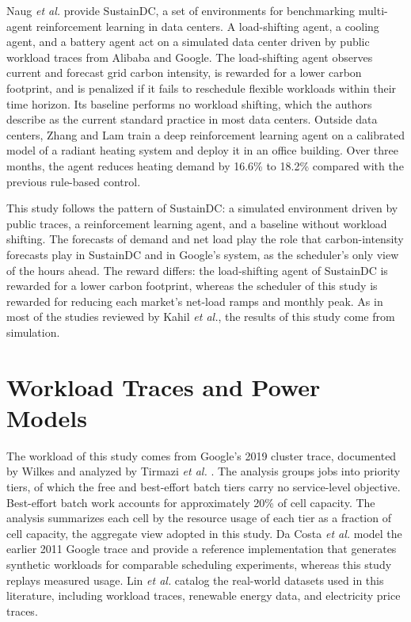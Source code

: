 \documentclass{UNCC-thesis}
\begin{document}
Naug \emph{et al.} \cite{naug2024sustaindc} provide SustainDC, a set of environments for
benchmarking multi-agent reinforcement learning in data centers. A load-shifting agent, a cooling
agent, and a battery agent act on a simulated data center driven by public workload traces from
Alibaba and Google. The load-shifting agent observes current and forecast grid carbon intensity,
is rewarded for a lower carbon footprint, and is penalized if it fails to reschedule flexible
workloads within their time horizon. Its baseline performs no workload shifting, which the authors
describe as the current standard practice in most data centers. Outside data centers, Zhang and
Lam \cite{zhang2018practical} train a deep reinforcement learning agent on a calibrated model of a
radiant heating system and deploy it in an office building. Over three months, the agent reduces
heating demand by 16.6\% to 18.2\% compared with the previous rule-based control.

This study follows the pattern of SustainDC: a simulated environment driven by public traces, a
reinforcement learning agent, and a baseline without workload shifting. The forecasts of demand
and net load play the role that carbon-intensity forecasts play in SustainDC and in Google's
system, as the scheduler's only view of the hours ahead. The reward differs: the load-shifting
agent of SustainDC is rewarded for a lower carbon footprint, whereas the scheduler of this study
is rewarded for reducing each market's net-load ramps and monthly peak. As in most of the studies reviewed by Kahil \emph{et al.}, the results
of this study come from simulation.

\section{Workload Traces and Power Models}
\label{sec:lit-data}

The workload of this study comes from Google's 2019 cluster trace, documented by Wilkes
\cite{wilkes2020clusterdata2019} and analyzed by Tirmazi \emph{et al.} \cite{tirmazi2020borg}.
The analysis groups jobs into priority tiers, of which the free and best-effort batch tiers carry
no service-level objective. Best-effort batch work accounts for approximately 20\% of cell
capacity.
The analysis summarizes each
cell by the resource usage of each tier as a fraction of cell capacity, the aggregate view adopted
in this study. Da Costa \emph{et al.} \cite{dacosta2016modeling} model the earlier 2011 Google
trace and provide a reference implementation that generates synthetic workloads for comparable
scheduling experiments, whereas this study replays measured usage. Lin \emph{et al.}
\cite{lin2024systematic} catalog the real-world datasets used in this literature, including
workload traces, renewable energy data, and electricity price traces.
\end{document}
